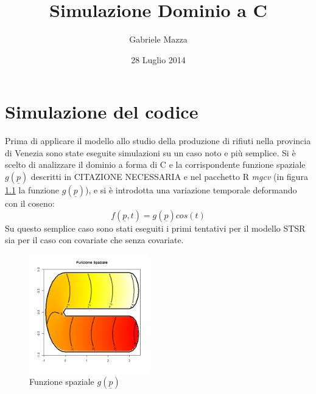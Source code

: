 \documentclass[a4paper,11pt,twoside,openright]{book}							%
\date{28 Luglio 2014}
\author{Gabriele Mazza}
\title{Simulazione Dominio a C}
\begin{document}

\chapter{Simulazione del codice}

Prima di applicare il modello allo studio della produzione di rifiuti nella provincia di Venezia sono state eseguite simulazioni su un caso noto e più semplice. Si è scelto di analizzare il dominio a forma di C e la corrispondente funzione spaziale $g(\underline p)$ descritti in CITAZIONE NECESSARIA e nel pacchetto R \textit{mgcv} (in figura \ref{fig:domC_fstest} la funzione $g(\underline p)$), e si è introdotta una variazione temporale deformando con il coseno:
$$
f(\underline p, t)=g(\underline p)cos(t)
$$
Su questo semplice caso sono stati eseguiti i primi tentativi per il modello STSR sia per il caso con covariate che senza covariate.
\begin{figure}[h]
	\centering
	\includegraphics[width=0.46\textwidth]{Immagini/DomC_fstest.png}   
	\caption{Funzione spaziale $g(\underline p)$}
	\label{fig:domC_fstest}
\end{figure}
\end{document}
